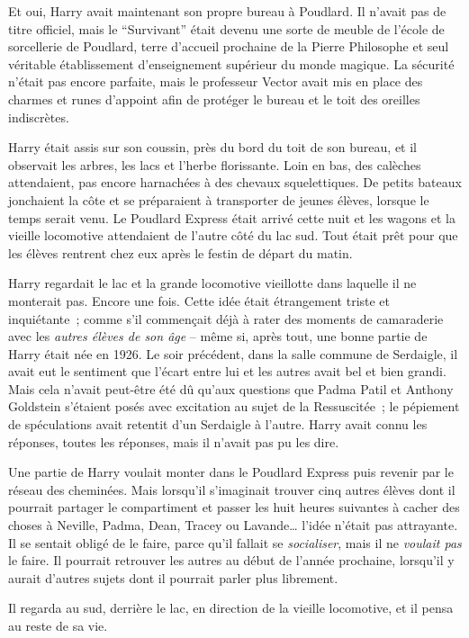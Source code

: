 Et oui, Harry avait maintenant son propre bureau à Poudlard. Il n'avait pas de titre officiel, mais le “Survivant” était devenu une sorte de meuble de l'école de sorcellerie de Poudlard, terre d'accueil prochaine de la Pierre Philosophe et seul véritable établissement d'enseignement supérieur du monde magique. La sécurité n'était pas encore parfaite, mais le professeur Vector avait mis en place des charmes et runes d'appoint afin de protéger le bureau et le toit des oreilles indiscrètes.

Harry était assis sur son coussin, près du bord du toit de son bureau, et il observait les arbres, les lacs et l'herbe florissante. Loin en bas, des calèches attendaient, pas encore harnachées à des chevaux squelettiques. De petits bateaux jonchaient la côte et se préparaient à transporter de jeunes élèves, lorsque le temps serait venu. Le Poudlard Express était arrivé cette nuit et les wagons et la vieille locomotive attendaient de l'autre côté du lac sud. Tout était prêt pour que les élèves rentrent chez eux après le festin de départ du matin.

Harry regardait le lac et la grande locomotive vieillotte dans laquelle il ne monterait pas. Encore une fois. Cette idée était étrangement triste et inquiétante~; comme s'il commençait déjà à rater des moments de camaraderie avec les \emph{autres élèves de son âge} -- même si, après tout, une bonne partie de Harry était née en 1926. Le soir précédent, dans la salle commune de Serdaigle, il avait eut le sentiment que l'écart entre lui et les autres avait bel et bien grandi. Mais cela n'avait peut-être été dû qu'aux questions que Padma Patil et Anthony Goldstein s'étaient posés avec excitation au sujet de la Ressuscitée~; le pépiement de spéculations avait retentit d'un Serdaigle à l'autre. Harry avait connu les réponses, toutes les réponses, mais il n'avait pas pu les dire.

Une partie de Harry voulait monter dans le Poudlard Express puis revenir par le réseau des cheminées. Mais lorsqu'il s'imaginait trouver cinq autres élèves dont il pourrait partager le compartiment et passer les huit heures suivantes à cacher des choses à Neville, Padma, Dean, Tracey ou Lavande… l'idée n'était pas attrayante. Il se sentait obligé de le faire, parce qu'il fallait se \emph{socialiser}, mais il ne \emph{voulait pas} le faire. Il pourrait retrouver les autres au début de l'année prochaine, lorsqu'il y aurait d'autres sujets dont il pourrait parler plus librement.

Il regarda au sud, derrière le lac, en direction de la vieille locomotive, et il pensa au reste de sa vie.

